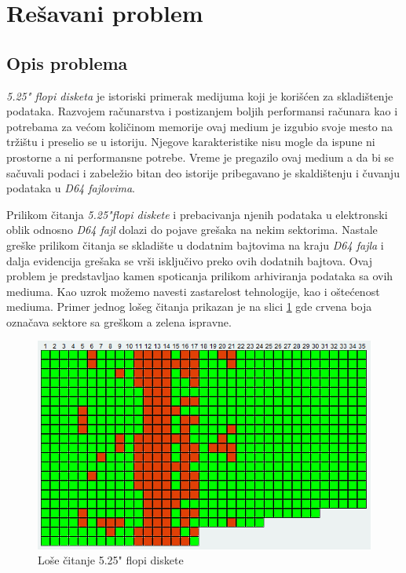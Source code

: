 \section{Rešavani problem}

\subsection{Opis problema}

\textit{5.25" flopi disketa} je istoriski primerak medijuma koji je korišćen za  \newline skladištenje podataka. Razvojem računarstva i postizanjem boljih performansi računara kao i potrebama za većom količinom memorije ovaj medium je izgubio svoje mesto na tržištu i preselio se u istoriju. Njegove karakteristike nisu mogle da ispune ni prostorne a ni performansne potrebe.  Vreme je pregazilo ovaj medium a da bi se sačuvali podaci i zabeležio bitan deo istorije pribegavano je skaldištenju i čuvanju podataka u \textit{D64 fajlovima}.

Prilikom čitanja \textit{5.25"flopi diskete} i prebacivanja njenih podataka u elektronski oblik odnosno \textit{D64 fajl} dolazi do pojave grešaka na nekim sektorima. Nastale greške prilikom čitanja se skladište u dodatnim bajtovima na kraju \textit{D64 fajla} i dalja evidencija grešaka se vrši isključivo preko ovih dodatnih bajtova. Ovaj problem je predstavljao kamen spoticanja prilikom arhiviranja podataka sa ovih mediuma. Kao uzrok možemo navesti zastarelost tehnologije, kao i oštećenost mediuma. Primer jednog lošeg čitanja prikazan je na slici \ref{img:loseCitanje} gde crvena boja označava sektore sa greškom a zelena ispravne.

\begin{figure}[ht]
\begin{center}
\includegraphics{img/loseCitanje.png}
\caption{Loše čitanje 5.25" flopi diskete}
\label{img:loseCitanje}
\end{center}
\end{figure}

